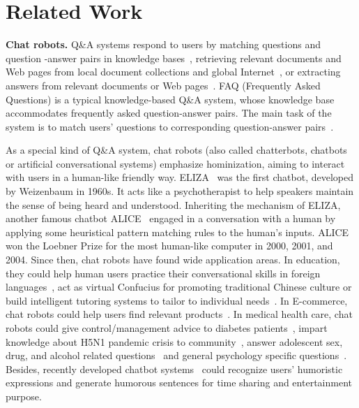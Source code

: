 \section{Related Work}
\textbf{Chat robots.}
Q\&A systems respond to users by matching questions and question
-answer pairs in knowledge bases~\cite{2Moldovan2001,3Tapeh2008}, retrieving relevant documents and Web pages from local
document collections and global Internet~\cite{6Start,7Encarta}, or extracting answers from relevant documents or Web pages~\cite{8lin2003,9katz2003}.
FAQ (Frequently Asked Questions) is a typical knowledge-based Q\&A system, whose knowledge base accommodates
frequently asked question-answer pairs. The main task of the system is to match users' questions to corresponding
question-answer pairs~\cite{5Burke1997}.

As a special kind of Q\&A system, chat robots (also called chatterbots, chatbots or artificial conversational systems) emphasize hominization, aiming to interact with users in a human-like friendly way.
ELIZA~\cite{10weizenbaum1966} was the first chatbot, developed by Weizenbaum in 1960s. It
acts like a psychotherapist to help speakers maintain the sense of being heard and understood.
Inheriting the mechanism of ELIZA, another famous chatbot ALICE~\cite{11ALice} engaged in a conversation with a human
by applying some heuristical pattern matching rules to the human's inputs.
ALICE won the Loebner Prize for the most human-like computer in 2000, 2001, and 2004. Since then, chat robots have found wide application areas.
In education, they could help human users
practice their conversational skills in foreign languages~\cite{13zakos2008,14stewart2007},
act as virtual Confucius for promoting traditional Chinese culture\cite{16wang2013} or
build intelligent tutoring systems to tailor to individual needs~\cite{17kerly2007,18latham2012}.
In E-commerce, chat robots could help users find relevant products~\cite{20chai2001,21goh2003}. In medical health care, chat robots could give control/management advice to diabetes patients~\cite{22lokman9},
impart knowledge about H5N1 pandemic crisis to community~\cite{21goh2003},
answer adolescent sex, drug, and alcohol related questions~\cite{26crutzen2011} and
general psychology specific questions~\cite{25liu2013}. Besides, recently developed chatbot systems~\cite{28augello2008,30SIMSIMI,31xiaohuangji} could recognize users' humoristic expressions and generate humorous sentences for time sharing and entertainment purpose.


